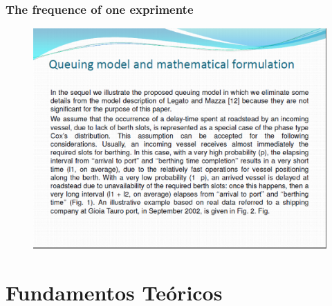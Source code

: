 \documentclass{beamer}
\begin{document}
\begin{frame}
\frametitle{The frequence of one exprimente }
\begin{figure}[!th]
\begin{center}
\includegraphics[width=1\textwidth]{img/pic3.eps}
\end{center}
\end{figure}
\end{frame}


\section{Fundamentos Teóricos}
\end{document}
